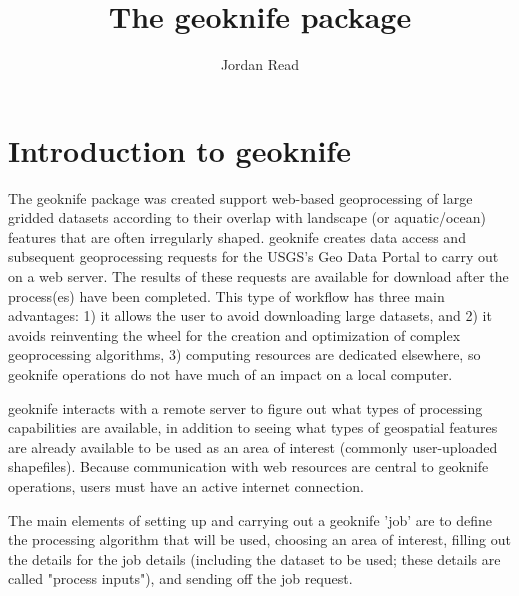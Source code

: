 \documentclass[a4paper,11pt]{article}
\begin{document}





\title{The geoknife package}
\author[1]{Jordan Read}




\maketitle
\tableofcontents

\section{Introduction to geoknife}
The geoknife package was created support web-based geoprocessing of large gridded datasets according to their overlap with landscape (or aquatic/ocean) features that are often irregularly shaped. geoknife creates data access and subsequent geoprocessing requests for the USGS's Geo Data Portal to carry out on a web server. The results of these requests are available for download after the process(es) have been completed. This type of workflow has three main advantages: 1) it allows the user to avoid downloading large datasets, and 2) it avoids reinventing the wheel for the creation and optimization of complex geoprocessing algorithms, 3) computing resources are dedicated elsewhere, so geoknife operations do not have much of an impact on a local computer. 

geoknife interacts with a remote server to figure out what types of processing capabilities are available, in addition to seeing what types of geospatial features are already available to be used as an area of interest (commonly user-uploaded shapefiles). Because communication with web resources are central to geoknife operations, users must have an active internet connection. 

The main elements of setting up and carrying out a geoknife 'job' are to define the processing algorithm that will be used, choosing an area of interest, filling out the details for the job details (including the dataset to be used; these details are called "process inputs"), and sending off the job request. 

\end{document}
